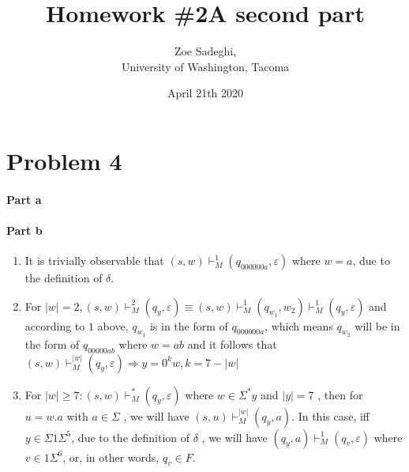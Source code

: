 \documentclass{article}
\title{Homework \#2A second part}
\date{April 21th 2020}
\author{Zoe Sadeghi,\\University of Washington, Tacoma}
\begin{document}
\maketitle

\section{Problem 4}

\paragraph{Part a}
\begin{center}
\end{center}


\paragraph{Part b}
\begin{enumerate}

\item It is trivially observable that $(s,w) \vdash^1_M (q_{000000a},\varepsilon)$ where $w=a$, due to the definition of $\delta$.

\item For $|w| = 2, (s,w) \vdash^2_M (q_y, \varepsilon) \equiv (s, w) \vdash^1_M (q_{w_1}, w_2) \vdash^1_M (q_y, \varepsilon)$ and according to $1$ above, $q_{w_1}$ is in the form of $q_{000000a}$, which means $q_{w_2}$ will be in the form of $q_{00000ab}$ where $w=ab$ and it follows that $(s,w) \vdash^{|w|}_M (q_y, \varepsilon) \Rightarrow y= 0^k w , k=7-|w|$

\item For ${|w|} \geq 7 : (s, w) \vdash^*_M (q_y, \varepsilon)$ where $w \in \Sigma^*y$ and $|y|= 7$ , then for $u=w.a$ with $a \in \Sigma$ , we will have $(s, u) \vdash^{|w|}_M (q_y, a)$. In this case, iff $y \in \Sigma1\Sigma^5$, due to the definition of $\delta$ , we will have $(q_y, a) \vdash^1_M (q_v, \varepsilon)$ where $v \in 1\Sigma^6$, or, in other words, $q_v \in F$.

\end{enumerate}
\end{document}
